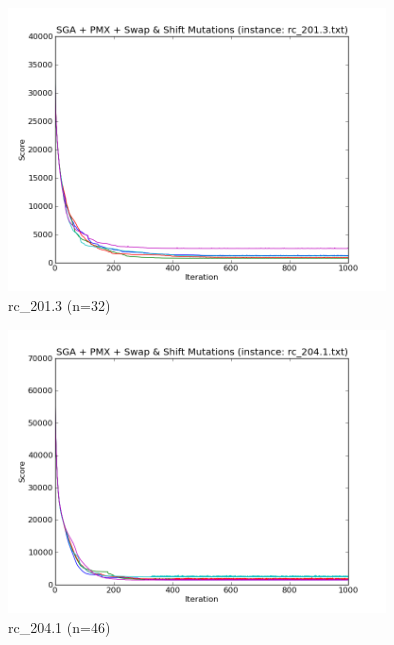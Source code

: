 \begin{frame}
    \begin{figure}
        \centering
        \includegraphics[width=10cm]{charts/rc_201_3.png}
        \caption{rc\_201.3 (n=32)}
    \end{figure}
\end{frame}

\begin{frame}
    \begin{figure}
        \centering
        \includegraphics[width=10cm]{charts/rc_204_1.png}
        \caption{rc\_204.1 (n=46)}       
    \end{figure}
\end{frame}

